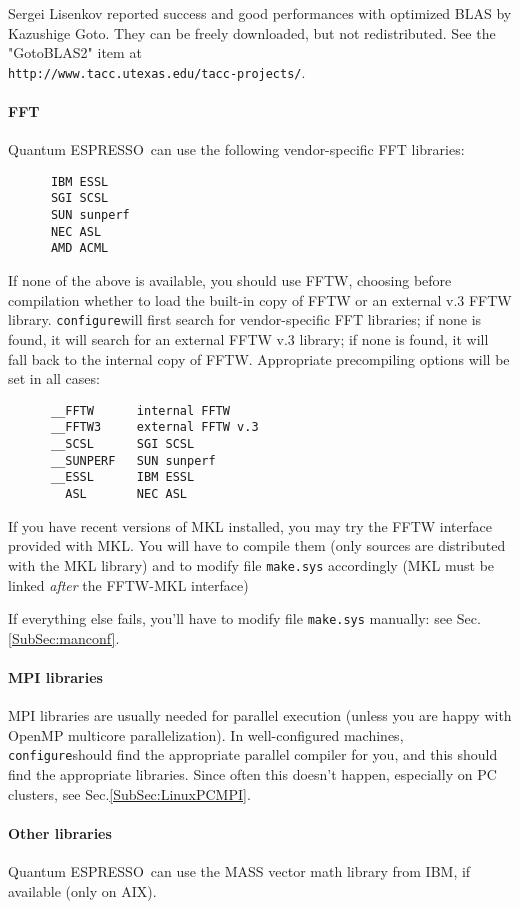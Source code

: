 \documentclass[12pt,a4paper]{article}
\def\qe{{\sc Quantum ESPRESSO}}
\def\configure{\texttt{configure}}
\begin{document}
Sergei Lisenkov reported success and good performances with optimized
BLAS by Kazushige Goto. They can be freely downloaded,
but not redistributed. See the "GotoBLAS2" item at\\
\texttt{http://www.tacc.utexas.edu/tacc-projects/}.

\paragraph{FFT}
\qe\ can use the following vendor-specific FFT libraries:
\begin{verbatim}
      IBM ESSL
      SGI SCSL
      SUN sunperf
      NEC ASL
      AMD ACML
\end{verbatim}
If none of the above is available, you should use FFTW, choosing
before compilation whether to load the built-in copy of FFTW 
or an external v.3 FFTW library.
\configure will first search for vendor-specific FFT libraries;
if none is found, it will search for an external FFTW v.3 library;
if none is found, it will fall back to the internal  copy of FFTW.
Appropriate precompiling options will be set in all cases:
\begin{verbatim}
      __FFTW      internal FFTW
      __FFTW3     external FFTW v.3
      __SCSL      SGI SCSL
      __SUNPERF   SUN sunperf 
      __ESSL      IBM ESSL
        ASL       NEC ASL
\end{verbatim}
If you have recent versions of MKL installed, you may try the 
FFTW interface provided with MKL. You will have to compile them
(only sources are distributed with the MKL library)
and to modify file \texttt{make.sys} accordingly (MKL must be linked {\em after}
the FFTW-MKL interface)

If everything else fails, you'll have to modify file \texttt{make.sys}
manually: see Sec.\ref{SubSec:manconf}.
\paragraph{MPI libraries} 
MPI libraries are usually needed for parallel execution 
(unless you are happy with OpenMP multicore parallelization).
In well-configured machines, \configure should find the appropriate
parallel compiler for you, and this should find the appropriate
libraries. Since often this doesn't 
happen, especially on PC clusters, see Sec.\ref{SubSec:LinuxPCMPI}.

\paragraph{Other libraries}
\qe\ can use the MASS vector math
library from IBM, if available (only on AIX).
    
\end{document}

